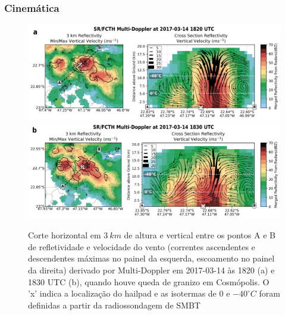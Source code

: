 \subsubsection{Cinemática}\label{cinematica_201703014}

\begin{figure}[htb]
	\centering
	\caption{Corte horizontal em $3\:km$ de altura e vertical entre os pontos A e B de refletividade e velocidade do vento (correntes ascendentes e descendentes máximas no painel da esquerda, escoamento no painel da direita) derivado por Multi-Doppler em 2017-03-14 às 1820 (a) e 1830 UTC (b), quando houve queda de granizo em Cosmópolis. O 'x' indica a localização do hailpad e as isotermas de $0$ e $-40^{\circ}C$ foram definidas a partir da radiossondagem de SMBT} 
	\label{doppler_20170314_1}
	\vspace{-5pt}
	\includegraphics[width=\columnwidth]{../MultiDoppler_Processing/figures/SR-FCTH 2017-03-14 1820 UTC.png}
		\label{dopplera_20170314_1} \\
	\vspace{-15pt}
	\includegraphics[width=\columnwidth]{../MultiDoppler_Processing/figures/SR-FCTH 2017-03-14 1830 UTC.png}
		\label{dopplerb_20170314_1} \\
	\vspace{-5pt}
\end{figure}

